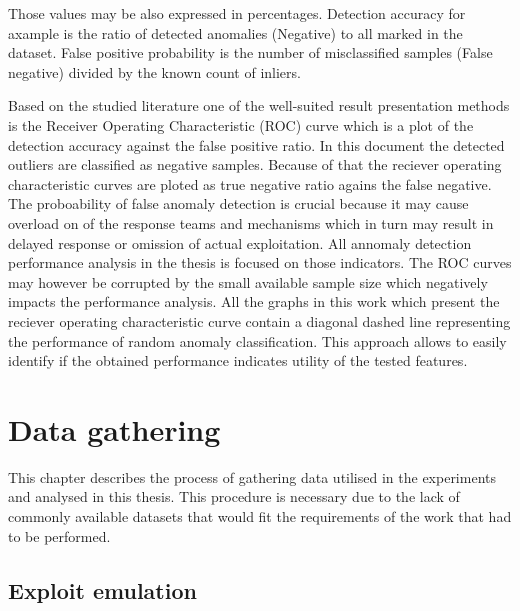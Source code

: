 \documentclass[a4paper,twoside,12pt]{book}
\begin{document}
Those values may be also expressed in percentages. Detection accuracy for axample is the ratio
of detected anomalies (Negative) to all marked in the dataset. False positive probability is 
the number of misclassified samples (False negative) divided by the known count of inliers.  

Based on the studied literature one of the well-suited result presentation methods is the Receiver 
Operating Characteristic (ROC) curve which is a plot of the detection accuracy against the false 
positive ratio. In this document the detected outliers are classified as negative samples. Because 
of that the reciever operating characteristic curves are ploted as true negative ratio agains the 
false negative. The proboability of false anomaly detection is crucial because it may cause overload
on of the response teams and mechanisms which in turn may result in delayed response or omission
of actual exploitation. All annomaly detection performance analysis in the thesis is focused
on those indicators. The ROC curves may however be corrupted by the small available sample size 
which negatively impacts the performance analysis. All the graphs in this work which present
the reciever operating characteristic curve contain a diagonal dashed line representing the
performance of random anomaly classification. This approach allows to easily identify if the obtained
performance indicates utility of the tested features.



\chapter{Data gathering}

This chapter describes the process of gathering data utilised in the experiments and 
analysed in this thesis. This procedure is necessary due to the lack of commonly available 
datasets that would fit the requirements of the work that had to be performed. 

\section{Exploit emulation}
\end{document}
